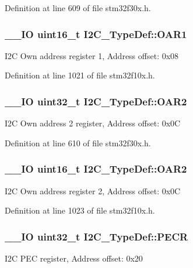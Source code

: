 Definition at line 609 of file stm32f30x.\-h.

\hypertarget{struct_i2_c___type_def_ad218fdcb9606477c1d63f8ee38d3c5c9}{
\subsubsection[{O\-A\-R1}]{\setlength{\rightskip}{0pt plus 5cm}\-\_\-\-\_\-\-I\-O {\bf uint16\-\_\-t} I2\-C\-\_\-\-Type\-Def\-::\-O\-A\-R1}}\label{struct_i2_c___type_def_ad218fdcb9606477c1d63f8ee38d3c5c9}
I2\-C Own address register 1, Address offset\-: 0x08 

Definition at line 1021 of file stm32f10x.\-h.

\hypertarget{struct_i2_c___type_def_a73988a218be320999c74a641b3d6e3c1}{
\subsubsection[{O\-A\-R2}]{\setlength{\rightskip}{0pt plus 5cm}\-\_\-\-\_\-\-I\-O {\bf uint32\-\_\-t} I2\-C\-\_\-\-Type\-Def\-::\-O\-A\-R2}}\label{struct_i2_c___type_def_a73988a218be320999c74a641b3d6e3c1}
I2\-C Own address 2 register, Address offset\-: 0x0\-C 

Definition at line 610 of file stm32f30x.\-h.

\hypertarget{struct_i2_c___type_def_a03189e2a57c81ae5d103739b72f52c93}{
\subsubsection[{O\-A\-R2}]{\setlength{\rightskip}{0pt plus 5cm}\-\_\-\-\_\-\-I\-O {\bf uint16\-\_\-t} I2\-C\-\_\-\-Type\-Def\-::\-O\-A\-R2}}\label{struct_i2_c___type_def_a03189e2a57c81ae5d103739b72f52c93}
I2\-C Own address register 2, Address offset\-: 0x0\-C 

Definition at line 1023 of file stm32f10x.\-h.

\hypertarget{struct_i2_c___type_def_a64c9036c1b58778cda97efa2e8a4be97}{
\subsubsection[{P\-E\-C\-R}]{\setlength{\rightskip}{0pt plus 5cm}\-\_\-\-\_\-\-I\-O {\bf uint32\-\_\-t} I2\-C\-\_\-\-Type\-Def\-::\-P\-E\-C\-R}}\label{struct_i2_c___type_def_a64c9036c1b58778cda97efa2e8a4be97}
I2\-C P\-E\-C register, Address offset\-: 0x20 


